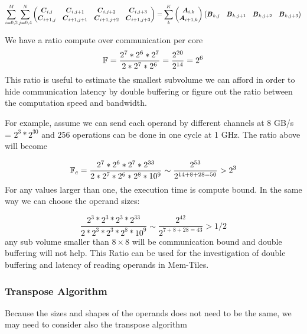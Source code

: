 \documentclass[conference]{IEEEtran}
\begin{document}
{\small \begin{equation*}
    \sum_{i=0,2}^M
    \sum_{j=0,4}^N
  \begin{pmatrix}
    {\boldsymbol C}_{i,j}  & {\boldsymbol C}_{i,j+1}    & {\boldsymbol C}_{i,j+2}    &{\boldsymbol C}_{i,j+3} \\
    {\boldsymbol C}_{i+1,j}  & {\boldsymbol C}_{i+1,j+1}   & {\boldsymbol C}_{i+1,j+2}  & {\boldsymbol C}_{i+1,j+3} \\
  \end{pmatrix}    = \sum_k^K
  \begin{pmatrix}
    {\boldsymbol A}_{i,k}  \\
    {\boldsymbol A}_{i+1,k}   \\
  \end{pmatrix}  
  \begin{pmatrix}
    {\boldsymbol B}_{k,j}  &  {\boldsymbol B}_{k,j+1}  & {\boldsymbol B}_{k,j+2}  &{\boldsymbol B}_{k,j+3} \\
  \end{pmatrix}    
\end{equation*}
}



We have a ratio compute over communication per core
\begin{equation}
  \label{eq:ratio}
  \F = \frac{2^7 * 2^6 * 2^7 } { 2* 2^7 * 2^6} = \frac{2^{20}}{2^{14}} = 2^6
\end{equation}
This ratio is useful to estimate the smallest subvolume we can afford
in order to hide communication latency by double buffering or figure
out the ratio between the computation speed and bandwidth. 

For example, assume we can send each operand by different channels at
8 GB/s = $2^3 *2^{30}$ and 256 operations can be done in one cycle at
1 GHz. The ratio above will become

\[
\mathbb{F}_c = \frac{2^7 * 2^6 * 2^7 * 2^{33}} { 2* 2^7 * 2^6* 2^8 *10^9} \sim \frac{2^{53}}{2^{14+8+28=50}} > 2^3  
\]
For any values larger than one, the execution time is compute
bound. In the same way we can choose the operand sizes:

\[
\frac{2^3 * 2^3 * 2^3 * 2^{33}} { 2* 2^3 * 2^3* 2^8 *10^9} \sim \frac{2^{42}}{2^{7+8+28=43}} >1/2    
\]
any sub volume smaller than $8 \times 8$ will be communication bound
and double buffering will not help. This Ratio can be used for the
investigation of double buffering and latency of reading operands in
Mem-Tiles.

\subsubsection{Transpose Algorithm}
Because the sizes and shapes of the operands does not need to be the
same, we may need to consider also the transpose algorithm
\end{document}
